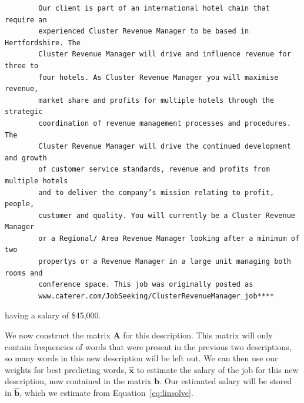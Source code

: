 \documentclass[12pt]{article}
\begin{document}
    \begin{lstlisting}
        Our client is part of an international hotel chain that require an
        experienced Cluster Revenue Manager to be based in Hertfordshire. The
        Cluster Revenue Manager will drive and influence revenue for three to
        four hotels. As Cluster Revenue Manager you will maximise revenue,
        market share and profits for multiple hotels through the strategic
        coordination of revenue management processes and procedures. The
        Cluster Revenue Manager will drive the continued development and growth
        of customer service standards, revenue and profits from multiple hotels
        and to deliver the company’s mission relating to profit, people,
        customer and quality. You will currently be a Cluster Revenue Manager
        or a Regional/ Area Revenue Manager looking after a minimum of two
        propertys or a Revenue Manager in a large unit managing both rooms and
        conference space. This job was originally posted as
        www.caterer.com/JobSeeking/ClusterRevenueManager_job****
    \end{lstlisting} having a salary of \$45,000.
    
    \begin{center} 
        
        
    \end{center}

    We now construct the matrix $\bm{A}$ for this description. This matrix will
    only contain frequencies of words that were present in the previous two
    descriptions, so many words in this new description will be left out. We
    can then use our weights for best predicting words, $\bm{\hat{x}}$ to
    estimate the salary of the job for this new description, now contained in
    the matrix $\bm{b}$. Our estimated salary will be stored in $\bm{\hat{b}}$,
    which we estimate from Equation~\ref{eq:linsolve}. \\
\end{document}
